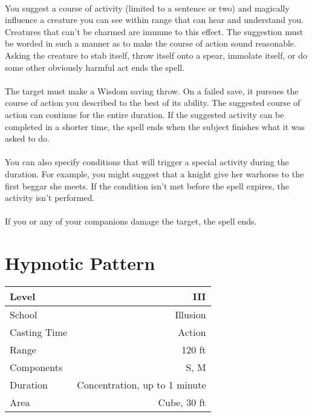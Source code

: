 \documentclass[a5paper,12pt]{article}
\begin{document}
\paragraph{}
You suggest a course of activity (limited to a sentence or two) and magically influence a creature you can see within range that can hear and understand you. Creatures that can't be charmed are immune to this effect. The suggestion must be worded in such a manner as to make the course of action sound reasonable. Asking the creature to stab itself, throw itself onto a spear, immolate itself, or do some other obviously harmful act ends the spell.

\paragraph{}
The target must make a Wisdom saving throw. On a failed save, it pursues the course of action you described to the best of its ability. The suggested course of action can continue for the entire duration. If the suggested activity can be completed in a shorter time, the spell ends when the subject finishes what it was asked to do.

\paragraph{}
You can also specify conditions that will trigger a special activity during the duration. For example, you might suggest that a knight give her warhorse to the first beggar she meets. If the condition isn't met before the spell expires, the activity isn't performed.

\paragraph{}
If you or any of your companions damage the target, the spell ends.

\newpage

\section*{Hypnotic Pattern}
\begin{table}[h]
   \centering
   \begin{tabular}{|l|r|}
      \hline
      Level        & III \\
      \hline
      School       & Illusion\\
      \hline
      Casting Time & Action \\
      \hline
      Range        & 120 ft \\
      \hline
      Components   & S, M \\
      \hline
      Duration     & Concentration, up to 1 minute\\
      \hline
      Area         & Cube, 30 ft\\
      \hline
   \end{tabular}
\end{table}
\end{document}
